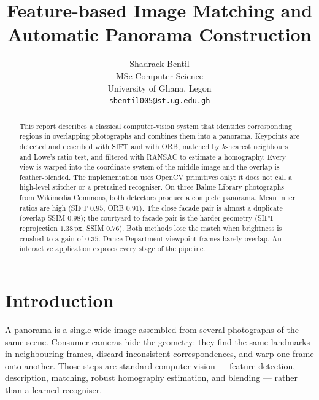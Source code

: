 \documentclass[10pt,twocolumn,letterpaper]{article}
\begin{document}
\title{Feature-based Image Matching and Automatic Panorama Construction}

\author{
Shadrack Bentil\\
MSc Computer Science\\
University of Ghana, Legon\\
{\tt\small sbentil005@st.ug.edu.gh}
}

\maketitle

\begin{abstract}
This report describes a classical computer-vision system that identifies corresponding regions in overlapping photographs and combines them into a panorama. Keypoints are detected and described with SIFT and with ORB, matched by $k$-nearest neighbours and Lowe's ratio test, and filtered with RANSAC to estimate a homography. Every view is warped into the coordinate system of the middle image and the overlap is feather-blended. The implementation uses OpenCV primitives only: it does not call a high-level stitcher or a pretrained recogniser. On three Balme Library photographs from Wikimedia Commons, both detectors produce a complete panorama. Mean inlier ratios are high (SIFT $0.95$, ORB $0.91$). The close facade pair is almost a duplicate (overlap SSIM $0.98$); the courtyard-to-facade pair is the harder geometry (SIFT reprojection $1.38$\,px, SSIM $0.76$). Both methods lose the match when brightness is crushed to a gain of $0.35$. Dance Department viewpoint frames barely overlap. An interactive application exposes every stage of the pipeline.
\end{abstract}

\section{Introduction}

A panorama is a single wide image assembled from several photographs of the same scene. Consumer cameras hide the geometry: they find the same landmarks in neighbouring frames, discard inconsistent correspondences, and warp one frame onto another. Those steps are standard computer vision --- feature detection, description, matching, robust homography estimation, and blending --- rather than a learned recogniser.
\end{document}
